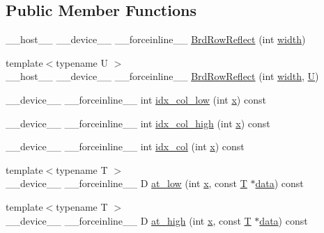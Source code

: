 \subsection*{Public Member Functions}
\begin{DoxyCompactItemize}
\item 
\-\_\-\-\_\-host\-\_\-\-\_\- \-\_\-\-\_\-device\-\_\-\-\_\- \-\_\-\-\_\-forceinline\-\_\-\-\_\- \hyperlink{structcv_1_1gpu_1_1device_1_1BrdRowReflect_a562474cae6e67ba36517b1287180b438}{Brd\-Row\-Reflect} (int \hyperlink{highgui__c_8h_a2474a5474cbff19523a51eb1de01cda4}{width})
\item 
{\footnotesize template$<$typename U $>$ }\\\-\_\-\-\_\-host\-\_\-\-\_\- \-\_\-\-\_\-device\-\_\-\-\_\- \-\_\-\-\_\-forceinline\-\_\-\-\_\- \hyperlink{structcv_1_1gpu_1_1device_1_1BrdRowReflect_acd72f48e55220e0526bc8f73dce54842}{Brd\-Row\-Reflect} (int \hyperlink{highgui__c_8h_a2474a5474cbff19523a51eb1de01cda4}{width}, \hyperlink{core__c_8h_aa9c521f41af9a5191e5e4b6ffbae211a}{U})
\item 
\-\_\-\-\_\-device\-\_\-\-\_\- \-\_\-\-\_\-forceinline\-\_\-\-\_\- int \hyperlink{structcv_1_1gpu_1_1device_1_1BrdRowReflect_ab6845c1b4a30c605d2207927580b01ad}{idx\-\_\-col\-\_\-low} (int \hyperlink{highgui__c_8h_a6150e0515f7202e2fb518f7206ed97dc}{x}) const 
\item 
\-\_\-\-\_\-device\-\_\-\-\_\- \-\_\-\-\_\-forceinline\-\_\-\-\_\- int \hyperlink{structcv_1_1gpu_1_1device_1_1BrdRowReflect_a9977dcff5eb024ea6902f60366d5912a}{idx\-\_\-col\-\_\-high} (int \hyperlink{highgui__c_8h_a6150e0515f7202e2fb518f7206ed97dc}{x}) const 
\item 
\-\_\-\-\_\-device\-\_\-\-\_\- \-\_\-\-\_\-forceinline\-\_\-\-\_\- int \hyperlink{structcv_1_1gpu_1_1device_1_1BrdRowReflect_a920e4d9266d0aa88e04b3484b4f0ce74}{idx\-\_\-col} (int \hyperlink{highgui__c_8h_a6150e0515f7202e2fb518f7206ed97dc}{x}) const 
\item 
{\footnotesize template$<$typename T $>$ }\\\-\_\-\-\_\-device\-\_\-\-\_\- \-\_\-\-\_\-forceinline\-\_\-\-\_\- D \hyperlink{structcv_1_1gpu_1_1device_1_1BrdRowReflect_a05801edf7bd35ca8fadea7d45cd73e3a}{at\-\_\-low} (int \hyperlink{highgui__c_8h_a6150e0515f7202e2fb518f7206ed97dc}{x}, const \hyperlink{calib3d_8hpp_a3efb9551a871ddd0463079a808916717}{T} $\ast$\hyperlink{legacy_8hpp_ab9fe6c09e6d02865a953fffc12fe6ca0}{data}) const 
\item 
{\footnotesize template$<$typename T $>$ }\\\-\_\-\-\_\-device\-\_\-\-\_\- \-\_\-\-\_\-forceinline\-\_\-\-\_\- D \hyperlink{structcv_1_1gpu_1_1device_1_1BrdRowReflect_ad638768fe795181a8dd8648d71912638}{at\-\_\-high} (int \hyperlink{highgui__c_8h_a6150e0515f7202e2fb518f7206ed97dc}{x}, const \hyperlink{calib3d_8hpp_a3efb9551a871ddd0463079a808916717}{T} $\ast$\hyperlink{legacy_8hpp_ab9fe6c09e6d02865a953fffc12fe6ca0}{data}) const 

\end{DoxyCompactItemize}
